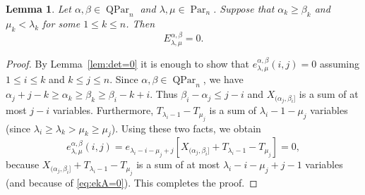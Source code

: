 \documentclass[12pt]{amsart}
\numberwithin{equation}{section}
\newtheorem{lem}[thm]{Lemma}
\theoremstyle{definition}
\newcommand\Par{\operatorname{Par}}
\newcommand\QPar{\operatorname{QPar}}
\begin{document}
\begin{lem}\label{lem:E=0}
  Let $\alpha,\beta\in\QPar_n$ and $\lambda,\mu\in\Par_n$. Suppose that
  $\alpha_k\ge \beta_k$ and $\mu_k<\lambda_k$ for some $1\le k\le n$. Then
\[
  E^{\alpha,\beta}_{\lambda,\mu} = 0.
\]
\end{lem}
\begin{proof}
  By Lemma~\ref{lem:det=0} it is enough to show that
  $e^{\alpha,\beta}_{\lambda,\mu}(i,j)=0$ assuming $1\le i\le k$ and $k\le j\le
  n$. Since $\alpha,\beta\in\QPar_n$, we have $\alpha_j
  +j-k\ge\alpha_k\ge\beta_k\ge\beta_i-k+i$. Thus $\beta_i-\alpha_j\le j-i$ and
  $X_{(\alpha_j,\beta_i]}$ is a sum of at most $j-i$ variables. Furthermore,
  $T_{\lambda_i-1}-T_{\mu_j}$ is a sum of $\lambda_i - 1 - \mu_j$ variables
  (since $\lambda_i\ge\lambda_k>\mu_k\ge\mu_j$). Using these two facts, we
  obtain
  \[
    e^{\alpha,\beta}_{\lambda,\mu}(i,j)
    =e_{\lambda_i-i-\mu_j+j}[X_{(\alpha_j,\beta_i]} + T_{\lambda_i-1}-T_{\mu_j}]
    = 0,
  \]
  because $X_{(\alpha_j,\beta_i]} + T_{\lambda_i-1}-T_{\mu_j}$ is a sum of at
  most $\lambda_i-i-\mu_j+j-1$ variables
  (and because of \eqref{eq:ekA=0}). This completes the proof.
\end{proof}
\end{document}
